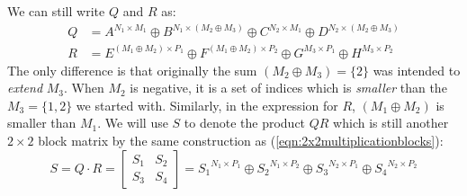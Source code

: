 We can still write $Q$  and $R$ as:
\begin{align*}
	Q &= A^{N_1 \times M_1} \oplus 
		B^{N_1 \times (M_2 \oplus M_3)} \oplus
		C^{N_2 \times M_1} \oplus
		D^{N_2 \times (M_2 \oplus M_3)}\\
	R &= E^{(M_1 \oplus M_2) \times P_1} \oplus
		F^{(M_1 \oplus M_2) \times P_2} \oplus
		G^{M_3 \times P_1} \oplus
		H^{M_3 \times P_2}	
\end{align*}
The only difference is that originally the sum $(M_2 \oplus M_3) = \{ 2 \}$ was intended to \emph{extend} $M_3$.
When $M_2$ is negative, it is a set of indices which is \emph{smaller} than the $M_3 = \{ 1,2 \}$ we started with.
Similarly, in the expression for $R$, $(M_1 \oplus M_2)$ is smaller than $M_1$.
We will use $S$ to denote the product $QR$ which is still another $2\times 2$ block matrix by the same construction 
as (\ref{eqn:2x2multiplicationblocks}):
\begin{equation*}
	S = Q \cdot R  =
		\begin{bmatrix} S_1 & S_2 \\ S_3 & S_4 \end{bmatrix} =
		 {S_1}^{N_1 \times P_1} \oplus
		 {S_2}^{N_1 \times P_2} \oplus
		 {S_3}^{N_2 \times P_1} \oplus
		 {S_4}^{N_2 \times P_2}
\end{equation*}


